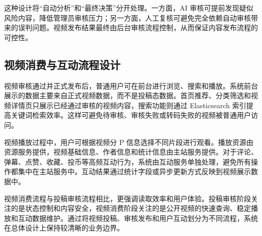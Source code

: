 这种设计将“自动分析”和“最终决策”分开处理。一方面，AI 审核可提前发现疑似风险内容，降低管理员审核压力；另一方面，人工复核可避免完全依赖自动审核带来的误判问题。视频发布结果最终由后台审核流程控制，从而保证内容发布流程的可控性。

\subsection{视频消费与互动流程设计}

\label{subsec:video-consume-interaction-process-design}

视频审核通过并正式发布后，普通用户可在前台进行浏览、搜索和播放。系统前台展示的数据主要来自正式视频数据，而不是投稿态数据。首页推荐、分类筛选和视频详情页只展示已经通过审核的视频内容，搜索功能则通过 Elasticsearch 索引提高关键词检索效率。这样可避免待审核、审核失败或转码失败的视频被普通用户访问。

视频播放过程中，用户可根据视频分 P 信息选择不同片段进行观看。播放资源由资源服务提供，视频基础信息、作者信息和统计信息由主站服务提供。对于评论、弹幕、点赞、收藏、投币等高频互动行为，系统由互动服务单独处理，避免所有操作都集中在主站服务中。互动结果通过统计字段或异步更新方式反映到视频展示数据中。

视频消费流程与投稿审核流程相比，更强调读取效率和用户体验。投稿审核阶段关注的是状态控制和内容安全，视频消费阶段关注的是公开视频的快速查询、稳定播放和互动数据维护。通过将视频投稿、审核发布和用户互动划分为不同流程，系统在总体设计上保持较清晰的业务边界。
